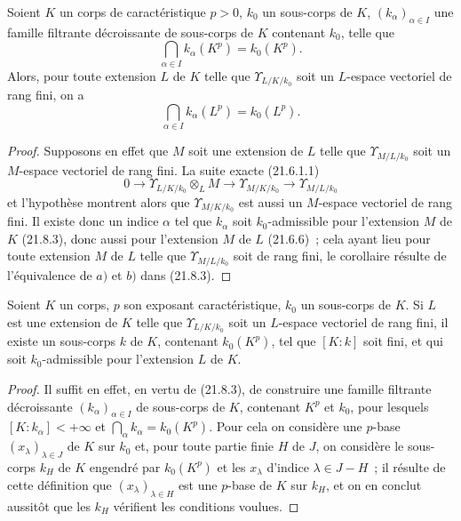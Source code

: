 \begin{corollary}[21.8.5]
\label{0.21.8.5-fr}
Soient $K$ un corps de caractéristique $p>0$, $k_0$ un sous-corps de $K$,
$(k_\alpha)_{\alpha\in I}$ une famille filtrante décroissante de sous-corps
de $K$ contenant $k_0$, telle que
\[
  \bigcap_{\alpha\in I}k_\alpha(K^p)=k_0(K^p).
\]
Alors, pour toute extension $L$ de $K$ telle que $\Upsilon_{L/K/k_0}$ soit
un $L$-espace vectoriel de rang fini, on a
\[
  \bigcap_{\alpha\in I}k_\alpha(L^p)=k_0(L^p).
\]
\end{corollary}

\begin{proof}
Supposons en effet que $M$ soit une extension de $L$ telle que
$\Upsilon_{M/L/k_0}$ soit un $M$-espace vectoriel de rang fini. La suite
exacte (21.6.1.1)
\[
  0\longrightarrow \Upsilon_{L/K/k_0}\otimes_L M
  \longrightarrow \Upsilon_{M/K/k_0}
  \longrightarrow \Upsilon_{M/L/k_0}
\]
et l'hypothèse montrent alors que $\Upsilon_{M/K/k_0}$ est aussi un
$M$-espace vectoriel de rang fini. Il existe donc un indice $\alpha$ tel que
$k_\alpha$ soit $k_0$-admissible pour l'extension $M$ de $K$ (21.8.3), donc
aussi pour l'extension $M$ de $L$ (21.6.6)~; cela ayant lieu pour toute
extension $M$ de $L$ telle que $\Upsilon_{M/L/k_0}$ soit de rang fini, le
corollaire résulte de l'équivalence de $a)$ et $b)$ dans (21.8.3).
\end{proof}

\begin{corollary}[21.8.6]
\label{0.21.8.6-fr}
Soient $K$ un corps, $p$ son exposant caractéristique, $k_0$ un sous-corps de
$K$. Si $L$ est une extension de $K$ telle que $\Upsilon_{L/K/k_0}$ soit un
$L$-espace vectoriel de rang fini, il existe un sous-corps $k$ de $K$,
contenant $k_0(K^p)$, tel que $[K:k]$ soit fini, et qui soit
$k_0$-admissible pour l'extension $L$ de $K$.
\end{corollary}

\begin{proof}
Il suffit en effet, en vertu de (21.8.3), de construire une famille filtrante
décroissante $(k_\alpha)_{\alpha\in I}$ de sous-corps de $K$, contenant
$K^p$ et $k_0$, pour lesquels $[K:k_\alpha]<+\infty$ et
$\bigcap_\alpha k_\alpha=k_0(K^p)$. Pour cela on considère une $p$-base
$(x_\lambda)_{\lambda\in J}$ de $K$ sur $k_0$ et, pour toute partie finie
$H$ de $J$, on considère le sous-corps $k_H$ de $K$ engendré par $k_0(K^p)$
et les $x_\lambda$ d'indice $\lambda\in J-H$~; il résulte de cette définition
que $(x_\lambda)_{\lambda\in H}$ est une $p$-base de $K$ sur $k_H$, et on en
conclut aussitôt que les $k_H$ vérifient les conditions voulues.
\end{proof}

